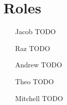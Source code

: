 
\section*{Roles}
\begin{itemize}
    \item[Jacob] TODO
    \item[Raz] TODO
    \item[Andrew] TODO
    \item[Theo] TODO
    \item[Mitchell] TODO
\end{itemize}
